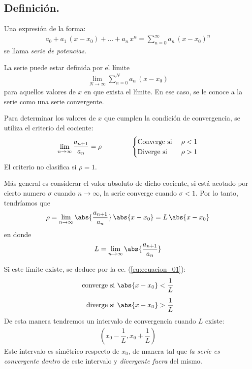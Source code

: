 \subsection{Definición.}

Una expresión de la forma:
\begin{align}
a_{0} + a_{1} \, (x - x_{0}) + \ldots + a_{n} \, x^{n} = \sum_{n=0}^{\infty} a_{n} \, (x - x_{0})^{n}
\label{eq:ecuacion_01}    
\end{align}
se llama \textit{serie de potencias}.
\par
La serie puede estar definida por el límite
\begin{align*}
\lim_{N \to \infty} \sum_{n=0}^{N} a_{n} \, (x - x_{0})
\end{align*}
para aquellos valores de $x$ en que exista el límite. En ese caso, se le conoce a la serie como una serie convergente.
\par
Para determinar los valores de $x$ que cumplen la condición de convergencia, se utiliza el criterio del cociente:
\begin{align*}
\lim_{n \to \infty} \dfrac{a_{n+1}}{a_{n}} = \rho \hspace{1.5cm} \begin{cases}
\mbox{Converge si } & \rho < 1 \\
\mbox{Diverge si } & \rho > 1
\end{cases}
\end{align*}
El criterio no clasifica si $\rho = 1$.
\par
Más general es considerar el valor absoluto de dicho cociente, si está acotado por cierto numero $\sigma$ cuando $n \to \infty$, la serie converge cuando $\sigma < 1$. Por lo tanto, tendríamos que
\begin{align*}
\rho = \lim_{n \to \infty} \abs{\dfrac{a_{n+1}}{a_{n}}} \, \abs{x - x_{0}} = L \, \abs{x - x_{0}}
\end{align*}
en donde
\begin{align*}
L = \lim_{n \to \infty} \abs{\dfrac{a_{n+1}}{a_{n}}}
\end{align*}
\par
Si este límite existe, se deduce por la ec. (\ref{eq:ecuacion_01}):
\begin{align}
\begin{aligned}        
\mbox{converge si } &\abs{x - x_{0}} < \dfrac{1}{L} \\[0.5em]
\mbox{diverge si } &\abs{x - x_{0}} > \dfrac{1}{L}
\end{aligned}
\label{eq:ecuacion_02}    
\end{align}
De esta manera tendremos un intervalo de convergencia cuando $L$ existe:
\begin{align*}
\left( x_{0} - \dfrac{1}{L}, x_{0} + \dfrac{1}{L} \right)
\end{align*}
Este intervalo es simétrico respecto de $x_{0}$, de manera tal que \emph{la serie es convergente dentro} de este intervalo y \emph{divergente fuera} del mismo.

